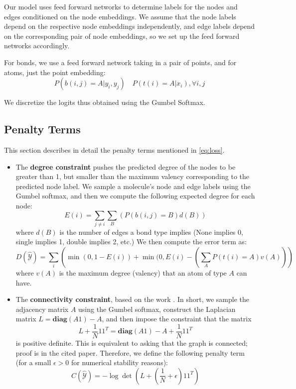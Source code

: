 \documentclass{article}
\newcommand{\norm}[1]{\left\lVert#1\right\rVert}
\begin{document}
Our model uses feed forward networks to determine labels for the nodes and edges conditioned on the node embeddings. We assume that the node labels depend on the respective node embeddings independently, and edge labels depend on the corresponding pair of node embeddings, so we set up the feed forward networks accordingly.

For bonds, we use a feed forward network taking in a pair of points, and for atoms, just the point embedding:
\[P(b(i,j) = A | y_i, y_j)\quad P(t(i) = A| x_i), \forall i,j \]


We discretize the logits thus obtained using the Gumbel Softmax.

\subsection{Penalty Terms}

This section describes in detail the penalty terms mentioned in \ref{eq:loss}.

\begin{itemize}
    \item The \textbf{degree constraint} pushes the predicted degree of the nodes to be greater than 1, but smaller than the maximum valency corresponding to the predicted node label. We sample a molecule's node and edge labels using the Gumbel softmax, and then we compute the following expected degree for each node:
    \[E(i) = \sum_{j\neq i}\sum_{B}\left(P(b(i,j) = B)d(B)\right) \]
    where $d(B)$ is the number of edges a bond type implies (None implies 0, single implies 1, double implies 2, etc.)
    We then compute the error term as:
    \[D(\hat{\mathcal{Y}}) = \sum_{i}\left(\min(0, 1 - E(i)) + \min(0, E(i) - \left(\sum_{A} P(t(i) = A)v(A)\right) \right)\] 
    where $v(A)$ is the maximum degree (valency) that an atom of type $A$ can have.
    \item The \textbf{connectivity constraint}, based on the work \cite{2017connectedness}. In short, we sample the adjacency matrix $A$ using the Gumbel softmax, construct the Laplacian matrix $L=\mathbf{diag}(A1) - A$, and then impose the constraint that the matrix
    \[L + \frac{1}{N}11^T  = \mathbf{diag}(A1) - A + \frac{1}{N}11^T\]
    is positive definite. This is equivalent to asking that the graph is connected; proof is in the cited paper. Therefore, we define the following penalty term (for a small $\epsilon > 0$ for numerical stability reasons):
    \[C(\hat{\mathcal{Y}}) = -\log\det\left(L + \left(\frac{1}{N} + \epsilon\right)11^T\right) \]
\end{itemize}
\end{document}
